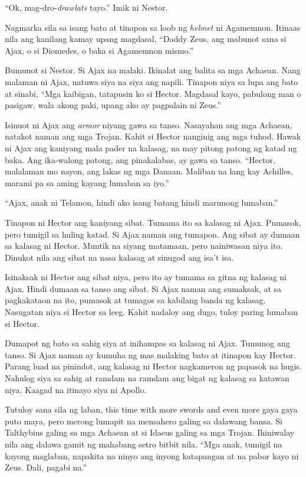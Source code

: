 \documentclass[12pt,letterpaper]{report}
\begin{document}
``Ok, mag-dro-\textit{drawlats} tayo.'' Imik ni Nestor.

Nagmarka sila sa isang bato at tinapon sa loob ng \textit{helmet} ni Agamemnon. Itinaas nila ang kanilang kamay upang magdasal, ``Daddy Zeus, ang mabunot sana si Ajax, o si Diomedes, o baka si Agamemnon mismo.''

Bumunot si Nestor. Si Ajax na malaki. Ikinalat ang balita sa mga Achaean. Nang malaman ni Ajax, natuwa siya na siya ang napili. Tinapon niya sa lupa ang bato at sinabi, ``Mga kaibigan, tatapusin ko si Hector. Magdasal kayo, pabulong  man o pasigaw, wala akong paki, upang ako ay pagpalain ni Zeus.''

Isinuot ni Ajax ang \textit{armor} niyang gawa sa tanso. Nasayahan ang mga Achaean, natakot naman ang mga Trojan. Kahit si Hector nanginig ang mga tuhod. Hawak ni Ajax ang kaniyang mala pader na kalasag, na may pitong patong ng katad ng baka. Ang ika-walong patong, ang pinakalabas, ay gawa sa tanso. ``Hector, malalaman mo nayon, ang lakas ng mga Danaan. Maliban na lang kay Achilles, marami pa sa aming kayang lumaban sa iyo.''

``Ajax, anak ni Telamon, hindi ako isang batang hindi marunong lumaban.''

Tinapon ni Hector ang kaniyang sibat. Tumama ito sa kalasag ni Ajax. Pumasok, pero tumigil sa huling katad. Si Ajax naman ang tumapon. Ang sibat ay dumaan sa kalasag ni Hector. Muntik na siyang matamaan, pero nainiwasan niya ito. Dinukot nila ang sibat na nasa kalasag at sinugod ang isa't isa.

Isinaksak ni Hector ang sibat niya, pero ito ay tumama sa gitna ng kalasag ni Ajax. Hindi dumaan sa tanso ang sibat. Si Ajax naman ang sumaksak, at sa pagkakataon na ito, pumasok at tumagos sa kabilang banda ng kalasag. Nasugatan niya si Hector sa leeg. Kahit nadaloy ang dugo, tuloy paring lumaban si Hector.

Dumapot ng bato sa sahig siya at inihampas sa kalasag ni Ajax. Tumunog ang tanso. Si Ajax naman ay kumuha ng mas malaking bato at itinapon kay Hector. Parang luad na pinindot, ang kalasag ni Hector nagkameron ng papasok na hugis. Nahulog siya sa sahig at ramdam na ramdam ang bigat ng kalasag sa katawan niya. Kaagad na itinayo siya ni Apollo.

Tutuloy sana sila ng laban, this time with more swords and even more gaya gaya puto maya, pero merong lumapit na mensahero galing sa dalawang bansa. Si Talthybius galing sa mga Achaean at si Idaeus galing sa mga Trojan. Ihiniwalay nila ang dalawa gamit ng mahabang setro bitbit nila. ``Mga anak, tumigil na kayong maglaban, napakita na ninyo ang inyong katapangan at na pabor kayo ni Zeus. Dali, pagabi na.''
\end{document}
